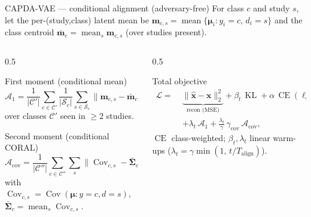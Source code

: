 \documentclass[aspectratio=169,11pt]{beamer}
\newcommand{\KL}{\operatorname{KL}}
\newcommand{\Cov}{\operatorname{Cov}}
\newcommand{\CE}{\operatorname{CE}}
\begin{document}
\begin{frame}{CAPDA-VAE --- conditional alignment (adversary-free)}
  For class $c$ and study $s$, let the per-(study,class) latent mean be
  $\mathbf m_{c,s}=\operatorname{mean}\{\bm\mu_i : y_i=c,\,d_i=s\}$ and the class
  centroid $\bar{\mathbf m}_c=\operatorname{mean}_s \mathbf m_{c,s}$ (over studies present).
  \begin{columns}[T]
    \begin{column}{0.5\textwidth}
      \begin{block}{First moment (conditional mean)}
        \[
          \mathcal A_{1}=\frac{1}{|\mathcal C'|}\sum_{c\in\mathcal C'}
          \frac{1}{|\mathcal S_c|}\sum_{s\in\mathcal S_c}
          \big\|\mathbf m_{c,s}-\bar{\mathbf m}_c\big\|_2^2 ,
        \]
        over classes $\mathcal C'$ seen in $\ge 2$ studies.
      \end{block}
      \begin{block}{Second moment (conditional CORAL)}
        \[
          \mathcal A_{\mathrm{cov}}=\frac{1}{|\mathcal C''|}\sum_{c\in\mathcal C''}
          \sum_{s}\big\|\Cov_{c,s}-\bar{\bm\Sigma}_c\big\|_F^2,
        \]
        with $\Cov_{c,s}=\Cov(\bm\mu : y{=}c,d{=}s)$,
        $\bar{\bm\Sigma}_c=\operatorname{mean}_s\Cov_{c,s}$.
      \end{block}
    \end{column}
    \begin{column}{0.5\textwidth}
      \begin{alertblock}{Total objective}
        \[
        \begin{aligned}
          \mathcal L=\;&\underbrace{\|\hat{\mathbf x}-\mathbf x\|_2^2}_{\text{recon (MSE)}}
          +\beta_t\,\KL +\alpha\,\CE(\bm\ell_{\text{cls}},y;\,\mathbf w)\\
          &+\lambda_t\,\mathcal A_{1}
          +\frac{\lambda_t}{\gamma}\,\gamma_{\mathrm{cov}}\,\mathcal A_{\mathrm{cov}},
        \end{aligned}
        \]
        $\CE$ class-weighted; $\beta_t,\lambda_t$ linear warm-ups
        ($\lambda_t=\gamma\min(1,\,t/T_{\text{align}})$).
      \end{alertblock}
    \end{column}
  \end{columns}
\end{frame}
\end{document}
